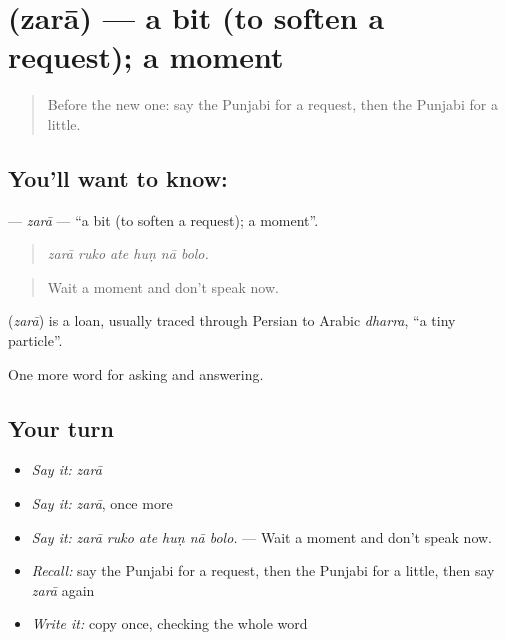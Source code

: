\section[\texorpdfstring{\pa{ਜ਼ਰਾ} (zarā)}{ਜ਼ਰਾ (zarā)}]{ (zarā) — a bit (to soften a request); a moment}

\label{lesson:PA-C337-zara}



\begin{quote}
Before the new one: say the Punjabi for a request, then the Punjabi for a little.
\end{quote}

\subsection*{You'll want to know: }
\textbf{} — \emph{zarā} — \textquotedblleft{}a bit (to soften a request); a moment\textquotedblright{}.

\begin{quote}
     
\end{quote}

\begin{quote}
\emph{zarā ruko ate huṇ nā bolo.}
\end{quote}

\begin{quote}
Wait a moment and don't speak now.
\end{quote}

\begin{cousinweb}
\textbf{} (\emph{zarā}) is a loan, usually traced through Persian to Arabic \emph{dharra}, \textquotedblleft{}a tiny particle\textquotedblright{}.
\end{cousinweb}

\begin{grammarlens}[title={What you've built}]
One more word for asking and answering.
\end{grammarlens}

\subsection*{Your turn}
\begin{itemize}
\raggedright
  \item \emph{Say it:} \emph{zarā}
  \item \emph{Say it:} \emph{zarā}, once more
  \item \emph{Say it:} \emph{zarā ruko ate huṇ nā bolo.} — Wait a moment and don't speak now.
  \item \emph{Recall:} say the Punjabi for a request, then the Punjabi for a little, then say \emph{zarā} again
  \item \emph{Write it:} copy \textbf{} once, checking the whole word
\end{itemize}

